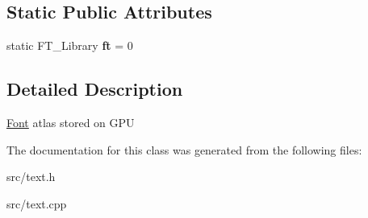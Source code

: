 \subsection*{Static Public Attributes}
\begin{DoxyCompactItemize}
\item 
\hypertarget{class_font_ae975f79e48736a286097d01c19f6fe6e}{}static F\+T\+\_\+\+Library {\bfseries ft} = 0\label{class_font_ae975f79e48736a286097d01c19f6fe6e}

\end{DoxyCompactItemize}


\subsection{Detailed Description}
\hyperlink{class_font}{Font} atlas stored on G\+P\+U 

The documentation for this class was generated from the following files\+:\begin{DoxyCompactItemize}
\item 
src/text.\+h\item 
src/text.\+cpp\end{DoxyCompactItemize}
